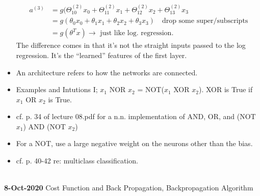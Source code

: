 \documentclass[10pt]{article}
\begin{document}
\begin{itemize}
\begin{align*}
      a^{(3)} &= g( \Theta^{(2)}_{10}x_0 + \Theta^{(2)}_{11}x_1 + \Theta^{(2)}_{12}x_2 + \Theta^{(2)}_{13}x_3 \\
      &= g( \theta_0x_0 + \theta_1x_1 + \theta_2x_2 + \theta_3x_3) \quad \text{drop some super/subscripts}\\
      &= g( \theta^T x) \rightarrow \text{ just like log. regression.}
    \end{align*}
    The difference comes in that it's not the straight inputs passed to the log regression. It's the ``learned'' features of the first layer.
  \item An architecture refers to how the networks are connected.
  \item Examples and Intutions I; $x_1$ NOR $x_2$ = NOT($x_1$ XOR $x_2$). XOR is True if $x_1$ OR $x_2$ is True.
  \item cf. p. 34 of lecture 08.pdf for a n.n. implementation of AND, OR, and (NOT $x_1$) AND (NOT $x_2$)
  \item For a NOT, use a large negative weight on the neurons other than the bias.
  \item cf. p. 40-42 re: multiclass classification.
\end{itemize}
\hfill \\
{\large \textbf{8-Oct-2020} Cost Function and Back Propagation, Backpropagation Algorithm}
\end{document}
